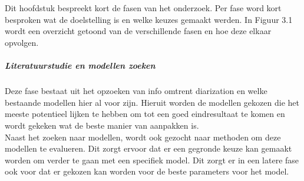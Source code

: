 
\chapter{}%
\label{ch:methodologie}


Dit hoofdstuk bespreekt kort de fasen van het onderzoek. Per fase word kort besproken wat de doelstelling is en welke keuzes gemaakt werden. In Figuur 3.1 wordt een overzicht getoond van de verschillende fasen en hoe deze elkaar opvolgen.

\paragraph{Literatuurstudie en modellen zoeken}
Deze fase bestaat uit het opzoeken van info omtrent diarization en welke bestaande modellen hier al voor zijn. Hieruit worden de modellen gekozen die het meeste potentieel lijken te hebben om tot een goed eindresultaat te komen en wordt gekeken wat de beste manier van aanpakken is.\\
Naast het zoeken naar modellen, wordt ook gezocht naar methoden om deze modellen te evalueren. Dit zorgt ervoor dat er een gegronde keuze kan gemaakt worden om verder te gaan met een specifiek model. Dit zorgt er in een latere fase ook voor dat er gekozen kan worden voor de beste parameters voor het model.

